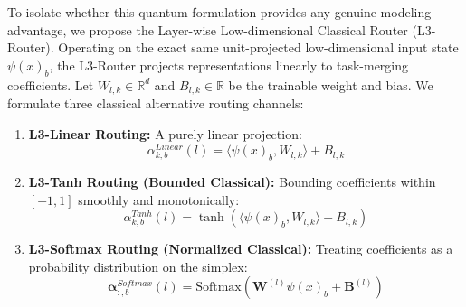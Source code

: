 To isolate whether this quantum formulation provides any genuine modeling advantage, we propose the Layer-wise Low-dimensional Classical Router (L3-Router). Operating on the exact same unit-projected low-dimensional input state $\psi(x)_b$, the L3-Router projects representations linearly to task-merging coefficients. Let $W_{l, k} \in \mathbb{R}^d$ and $B_{l, k} \in \mathbb{R}$ be the trainable weight and bias. We formulate three classical alternative routing channels:
\begin{enumerate}
    \item \textbf{L3-Linear Routing:} A purely linear projection:
    \begin{equation}
        \alpha_{k, b}^{Linear}(l) = \langle \psi(x)_b, W_{l, k} \rangle + B_{l, k}
    \end{equation}
    \item \textbf{L3-Tanh Routing (Bounded Classical):} Bounding coefficients within $[-1, 1]$ smoothly and monotonically:
    \begin{equation}
        \alpha_{k, b}^{Tanh}(l) = \tanh\left( \langle \psi(x)_b, W_{l, k} \rangle + B_{l, k} \right)
    \end{equation}
    \item \textbf{L3-Softmax Routing (Normalized Classical):} Treating coefficients as a probability distribution on the simplex:
    \begin{equation}
        \boldsymbol{\alpha}_{:, b}^{Softmax}(l) = \text{Softmax}\left( \mathbf{W}^{(l)} \psi(x)_b + \mathbf{B}^{(l)} \right)
    \end{equation}
\end{enumerate}

